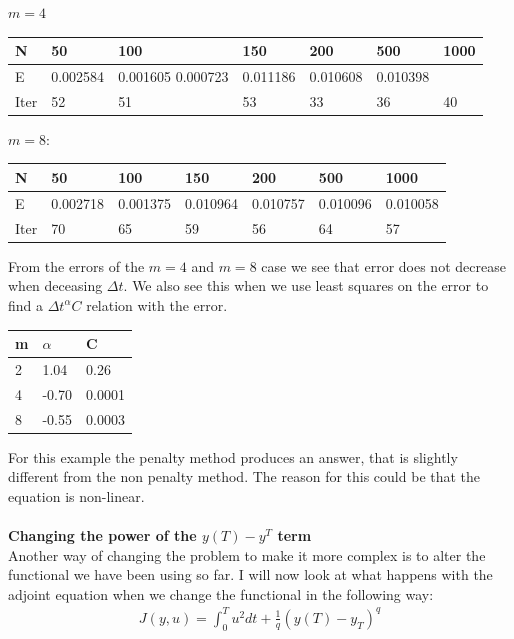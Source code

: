 \documentclass[11pt,a4paper]{report}
\begin{document}
$m=4$
\begin{center}
    \begin{tabular}{| l | l | l | l | l | l | l |}
    \hline
    N & 50 & 100  & 150 & 200 & 500 & 1000 \\ \hline
    E & 0.002584 & 0.001605 0.000723& 0.011186 & 0.010608 & 0.010398\\ \hline
    Iter & 52 & 51  & 53 & 33 & 36 & 40 \\ \hline
    \end{tabular}
\end{center}
$m=8$:
\begin{center}
    \begin{tabular}{| l | l | l | l | l | l | l |}
    \hline
    N & 50 & 100  & 150 & 200 & 500 & 1000 \\ \hline
    E & 0.002718 & 0.001375 &0.010964 & 0.010757 & 0.010096 & 0.010058	\\ \hline
    Iter & 70 & 65  & 59 & 56 & 64 & 57 \\ \hline
    \end{tabular}
\end{center}
From the errors of the $m=4$ and $m=8$ case we see that error does not decrease when deceasing $\Delta t$. We also see this when we use least squares on the error to find a $\Delta t^{\alpha}C$ relation with the error.
\begin{center}
    \begin{tabular}{| l | l | l |}
    \hline
    m & $\alpha$ & C \\ \hline
    2 & 1.04& 0.26\\ \hline
    4 & -0.70& 0.0001\\ \hline
    8 & -0.55&0.0003 \\ \hline
    \end{tabular}
\end{center}
For this example the penalty method produces an answer, that is slightly different from the non penalty method. The reason for this could be that the equation is non-linear.
\\
\\
\textbf{Changing the power of the $y(T)-y^T$ term}
\\
Another way of changing the problem to make it more complex is to alter the functional we have been using so far. I will now look at what happens with the adjoint equation when we change the functional in the following way:
  \begin{align*}
J(y,u) = \int_0^T u^2 dt + \frac{1}{q}(y(T)-y_T)^q
\end{align*}
\end{document}
